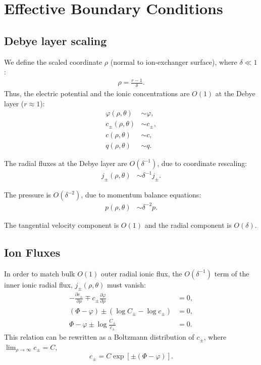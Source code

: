 \documentclass[MSc,beforeExam]{iitcsthesis}
\newcommand{\deriv}[2]{\frac{\partial #1}{\partial #2}}
\newcommand{\pars}[1]{\left(#1\right)}
\begin{document}
\appendix

\chapter{Effective Boundary Conditions} \label{append:slip}

\section{Debye layer scaling}

We define the scaled coordinate $\rho$ (normal to ion-exchanger surface), where $\delta \ll 1$:
\begin{align}
  \rho = \frac{r-1}{\delta}. 
\end{align}
Thus, the electric potential and the ionic concentrations are $O(1)$ at the Debye layer ($r \approx 1$):
\begin{align}
  \varphi(\rho,\theta) &\sim \varphi, \\
  c_\pm(\rho,\theta) &\sim c_\pm, \\
  c(\rho,\theta) &\sim c, \\
  q(\rho,\theta) &\sim q.
\end{align}

The radial fluxes at the Debye layer are $O(\delta^{-1})$, due to coordinate rescaling:
\begin{align}
  j_\pm(\rho, \theta) &\sim \delta^{-1} j_\pm.
\end{align}

The pressure is $O(\delta^{-2})$, due to momentum balance equations:
\begin{align}
  p(\rho, \theta) &\sim \delta^{-2} p.
\end{align}

The tangential velocity component is $O(1)$ and the radial component is $O(\delta)$.

\section{Ion Fluxes}

In order to match bulk $O(1)$ outer radial ionic flux, 
the $O(\delta^{-1})$ term of the inner ionic radial flux, $j_\pm(\rho, \theta)$ must vanish:
\begin{align}
 \nonumber
  -\deriv{c_\pm}{\rho} \mp c_\pm \deriv{\varphi}{\rho} &= 0, \\
  \pars{\varPhi - \varphi} \pm\pars{\log C_\pm - \log c_\pm} &= 0, \\
 \nonumber
  \varPhi - \varphi \pm \log \frac{C_\pm}{c_\pm} &= 0.
\end{align}
This relation can be rewritten as a Boltzmann distribution of $c_\pm$,
where $\lim_{\rho\rightarrow\infty} c_\pm = C$,
\begin{equation}
c_\pm = C \exp\left[\pm(\varPhi - \varphi)\right].
\end{equation}
\end{document}
